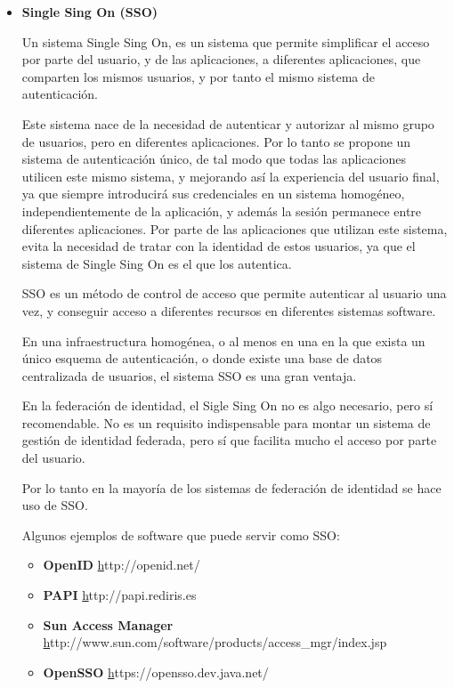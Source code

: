             \begin{itemize}

            \item \textbf{Single Sing On (SSO)}

    Un sistema Single Sing On, es un sistema que permite simplificar
    el acceso por parte del usuario, y de las aplicaciones, a
    diferentes aplicaciones, que comparten los mismos usuarios, y por
    tanto el mismo sistema de autenticación.

    Este sistema nace de la necesidad de autenticar y autorizar al
    mismo grupo de usuarios, pero en diferentes aplicaciones. Por lo
    tanto se propone un sistema de autenticación único, de tal modo
    que todas las aplicaciones utilicen este mismo sistema, y
    mejorando así la experiencia del usuario final, ya que siempre
    introducirá sus credenciales en un sistema homogéneo,
    independientemente de la aplicación, y además la sesión permanece
    entre diferentes aplicaciones. Por parte de las aplicaciones que
    utilizan este sistema, evita la necesidad de tratar con la
    identidad de estos usuarios, ya que el sistema de Single Sing On
    es el que los autentica.

    SSO es un método de control de acceso que permite autenticar al
    usuario una vez, y conseguir acceso a diferentes recursos en
    diferentes sistemas software.

    En una infraestructura homogénea, o al menos en una en la que
    exista un único esquema de autenticación, o donde existe una base
    de datos centralizada de usuarios, el sistema SSO es una gran
    ventaja.

    En la federación de identidad, el Sigle Sing On no es algo
    necesario, pero sí recomendable. No es un requisito indispensable
    para montar un sistema de gestión de identidad federada, pero sí
    que facilita mucho el acceso por parte del usuario.

    Por lo tanto en la mayoría de los sistemas de federación de
    identidad se hace uso de SSO.

    Algunos ejemplos de software que puede servir como SSO:
    \begin{itemize}
        \item \textbf{OpenID} \href{http://openid.net/}http://openid.net/
        \item \textbf{PAPI} \href{http://papi.rediris.es}http://papi.rediris.es
        \item \textbf{Sun Access Manager}
        \href{http://www.sun.com/software/products/access_mgr/index.jsp}http://www.sun.com/software/products/access\_mgr/index.jsp
        \item \textbf{OpenSSO} \href{https://opensso.dev.java.net/}https://opensso.dev.java.net/
    \end{itemize}


\end{itemize}
